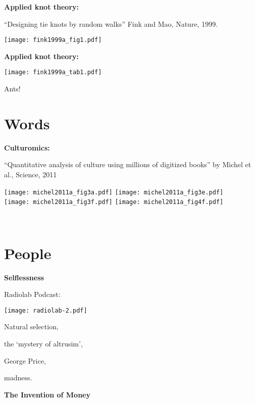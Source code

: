   \textbf{Applied knot theory:}

  ``Designing tie knots by random walks''\cite{fink1999a}
  Fink and Mao, Nature, 1999.

  \texttt{[image: fink1999a\_fig1.pdf]}


  \textbf{Applied knot theory:}
  
  
  \texttt{[image: fink1999a\_tab1.pdf]}



  Ants!


\section{Words}

  \textbf{Culturomics:}

  \small{``Quantitative analysis of culture using millions of
    digitized books'' by Michel et al., Science, 2011\cite{michel2011a}}

  \texttt{[image: michel2011a\_fig3a.pdf]} 
  \texttt{[image: michel2011a\_fig3e.pdf]} \\
  \texttt{[image: michel2011a\_fig3f.pdf]}
  \texttt{[image: michel2011a\_fig4f.pdf]}

  {\small
    \\
  }


\section{People}

  \textbf{Selflessness}

  Radiolab Podcast: 
  \bigskip
      
    \texttt{[image: radiolab-2.pdf]}
    
    
     
      Natural selection, 
     
      the `mystery of altrusim', 
     
      George Price, 
     
      madness.
    
  

  \textbf{The Invention of Money}

